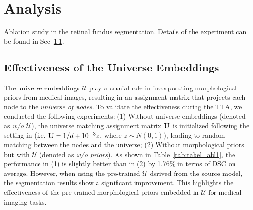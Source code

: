 \section{Analysis}

\begin{table}[htb!]
\setlength{\tabcolsep}{6pt}
\centering
  \caption{Ablation study in the retinal fundus segmentation. Details of the experiment can be found in Sec~\ref{sec:abl_ue}.}
  \vspace{-0.3cm}
  \begin{adjustbox}{width=0.999\linewidth}
    
  \end{adjustbox}
  \label{tab:tabel_abl1}
\end{table}


\subsection{Effectiveness of the Universe Embeddings}
\label{sec:abl_ue}
The universe embeddings $\mathcal{U}$ play a crucial role in incorporating morphological priors from medical images, resulting in an assignment matrix that projects each node to the \textit{universe of nodes}. To validate the effectiveness during the TTA, we conducted the following experiments: (1) Without universe embeddings (denoted as \textit{w/o $\mathcal{U}$}), the universe matching assignment matrix $\bold{U}$ is initialized following the setting in \cite{wang2020graduated} (i.e. $\bold{U}=1/d+10^{-3}z$, where $z\sim N(0,1)$), leading to random matching between the nodes and the universe; (2) Without morphological priors but with $\mathcal{U}$ (denoted as \textit{w/o priors}). As shown in Table~\ref{tab:tabel_abl1}, the performance in (1) is slightly better than in (2) by 1.76\% in terms of DSC on average. However, when using the pre-trained $\mathcal{U}$ derived from the source model, the segmentation results show a significant improvement. This highlights the effectiveness of the pre-trained morphological priors embedded in $\mathcal{U}$ for medical imaging tasks.

